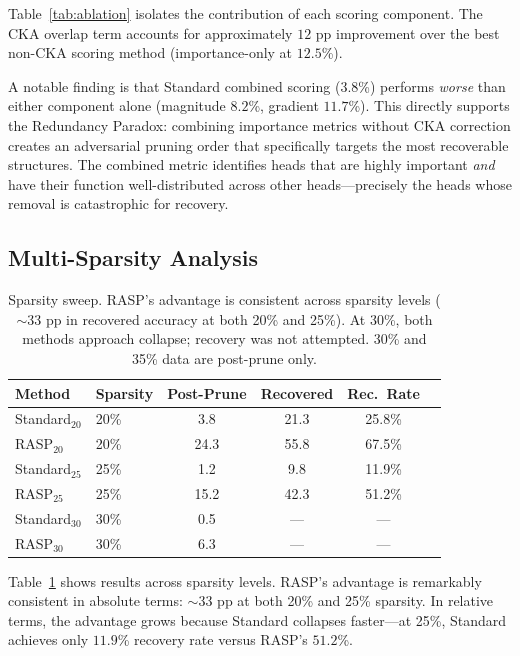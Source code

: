 \documentclass[11pt,a4paper]{article}
\begin{document}
Table~\ref{tab:ablation} isolates the contribution of each scoring component. The CKA overlap term accounts for approximately $12$ pp improvement over the best non-CKA scoring method (importance-only at $12.5$\%).

A notable finding is that Standard combined scoring ($3.8$\%) performs \emph{worse} than either component alone (magnitude $8.2$\%, gradient $11.7$\%). This directly supports the Redundancy Paradox: combining importance metrics without CKA correction creates an adversarial pruning order that specifically targets the most recoverable structures. The combined metric identifies heads that are highly important \emph{and} have their function well-distributed across other heads---precisely the heads whose removal is catastrophic for recovery.

\subsection{Multi-Sparsity Analysis}

\begin{table}[t]
\centering
\small
\begin{tabular}{@{}llcccc@{}}
\toprule
\textbf{Method} & \textbf{Sparsity} & \textbf{Post-Prune} & \textbf{Recovered} & \textbf{Rec.\ Rate} \\
\midrule
Standard$_{20}$ & 20\% & 3.8 & 21.3 & 25.8\% \\
RASP$_{20}$ & 20\% & 24.3 & 55.8 & 67.5\% \\
\midrule
Standard$_{25}$ & 25\% & 1.2 & 9.8 & 11.9\% \\
RASP$_{25}$ & 25\% & 15.2 & 42.3 & 51.2\% \\
\midrule
Standard$_{30}$ & 30\% & 0.5 & --- & --- \\
RASP$_{30}$ & 30\% & 6.3 & --- & --- \\
\bottomrule
\end{tabular}
\caption{Sparsity sweep. RASP's advantage is consistent across sparsity levels ($\sim$33 pp in recovered accuracy at both 20\% and 25\%). At 30\%, both methods approach collapse; recovery was not attempted. 30\% and 35\% data are post-prune only.}
\label{tab:sparsity}
\end{table}

Table~\ref{tab:sparsity} shows results across sparsity levels. RASP's advantage is remarkably consistent in absolute terms: $\sim$33 pp at both 20\% and 25\% sparsity. In relative terms, the advantage grows because Standard collapses faster---at 25\%, Standard achieves only $11.9$\% recovery rate versus RASP's $51.2$\%.
\end{document}
